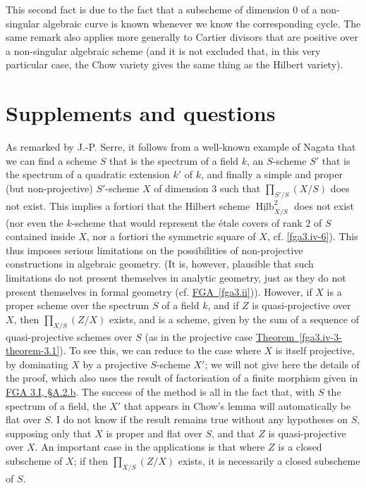   
  This second fact is due to the fact that a subscheme of dimension \(0\) of a non-singular algebraic curve is known whenever we know the corresponding cycle.
  The same remark also applies more generally to Cartier divisors that are positive over a non-singular algebraic scheme (and it is not excluded that, in this very particular case, the Chow variety gives the same thing as the Hilbert variety).\chapter{Supplements and questions}\thispagestyle{fancy}\label{fga3.iv-7}\par{}As remarked by J.-P. Serre, it follows from a well-known example of Nagata that we can find a scheme \(S\) that is the spectrum of a field \(k\), an \(S\)-scheme \(S'\) that is the spectrum of a quadratic extension \(k'\) of \(k\), and finally a simple and proper (but non-projective) \(S'\)-scheme \(X\) of dimension \(3\) such that \(\prod _{S'/S}(X/S)\) does not exist.
  This implies a fortiori that the Hilbert scheme \(\underline {\operatorname {Hilb}}_{X/S}^2\) does not exist (nor even the \(k\)-scheme that would represent the étale covers of rank \(2\) of \(S\) contained inside \(X\), nor a fortiori the symmetric square of \(X\), cf. \cref{fga3.iv-6}).
  This thus imposes serious limitations on the possibilities of non-projective constructions in algebraic geometry.
  (It is, however, plausible that such limitations do not present themselves in analytic geometry, just as they do not present themselves in formal geometry (cf. \hyperref[fga3.ii]{FGA~\ref*{fga3.ii}})).
  However, if \(X\) is a proper scheme over the spectrum \(S\) of a field \(k\), and if \(Z\) is quasi-projective over \(X\), then \(\prod _{X/S}(Z/X)\) exists, and is a scheme, given by the sum of a sequence of quasi-projective schemes over \(S\) (as in the projective case \hyperref[fga3.iv-3-theorem-3.1]{Theorem~\ref*{fga3.iv-3-theorem-3.1}}).
  To see this, we can reduce to the case where \(X\) is itself projective, by dominating \(X\) by a projective \(S\)-scheme \(X'\);
  we will not give here the details of the proof, which also uses the result of factorisation of a finite morphism given in \hyperref[fga3.i-a.2.b]{FGA 3.I, §A.2.b}.
  The success of the method is all in the fact that, with \(S\) the spectrum of a field, the \(X'\) that appears in Chow's lemma will automatically be flat over \(S\).
  I do not know if the result remains true without any hypotheses on \(S\), supposing only that \(X\) is proper and flat over \(S\), and that \(Z\) is quasi-projective over \(X\).
  An important case in the applications is that where \(Z\) is a closed subscheme of \(X\);
  if then \(\prod _{X/S}(Z/X)\) exists, it is necessarily a closed subscheme of \(S\).
  
